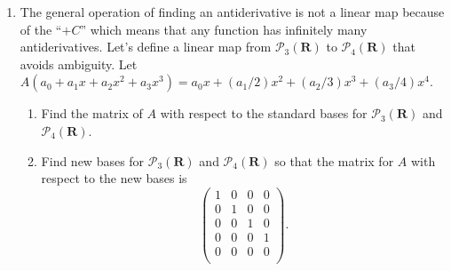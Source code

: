 \documentclass[12pt]{article}
\begin{document}
\begin{enumerate}
\item The general operation of finding an antiderivative is not a linear map because of the ``$+C$'' which means that any function has infinitely many antiderivatives.  Let's define a linear map from $\mathcal{P}_3(\mathbf{R})$ to $\mathcal{P}_4(\mathbf{R})$ that avoids ambiguity.  Let $A(a_0 + a_1x + a_2x^2 + a_3 x^3) = a_0x + (a_1/2)x^2 + (a_2/3)x^3 + (a_3/4) x^4$.
    \begin{enumerate}
    \item Find the matrix of $A$ with respect to the standard bases for $\mathcal{P}_3(\mathbf{R})$ and $\mathcal{P}_4(\mathbf{R})$.
    \item Find new bases for $\mathcal{P}_3(\mathbf{R})$ and $\mathcal{P}_4(\mathbf{R})$ so that the matrix for $A$ with respect to the new bases is
        \[
    \left(
      \begin{array}{cccc}
        1 & 0 & 0 & 0 \\
        0 & 1 & 0 & 0 \\
        0 & 0 & 1 & 0 \\
        0 & 0 & 0 & 1 \\
        0 & 0 & 0 & 0 \\
      \end{array}
    \right).
    \]
    \end{enumerate}


\end{enumerate}
\end{document}
